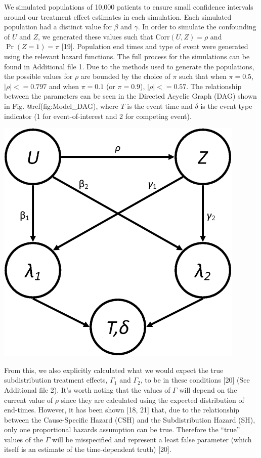 \documentclass[12pt,PhD,twoside,openright]{muthesis}
\begin{document}
We simulated populations of 10,000 patients to ensure small confidence intervals around our treatment effect estimates in each simulation. Each simulated population had a distinct value for \(\beta\) and \(\gamma\). In order to simulate the confounding of \(U\) and \(Z\), we generated these values such that \(\textrm{Corr}(U,Z) = \rho\) and \(\Pr(Z = 1) = \pi\) {[}19{]}. Population end times and type of event were generated using the relevant hazard functions. The full process for the simulations can be found in Additional file 1. Due to the methods used to generate the populations, the possible values for \(\rho\) are bounded by the choice of \(\pi\) such that when \(\pi = 0.5\), \(\left|\rho\right| <= 0.797\) and when \(\pi = 0.1\) (or \(\pi=0.9\)), \(\left|\rho\right| <= 0.57\). The relationship between the parameters can be seen in the Directed Acyclic Graph (DAG) shown in Fig. @ref(fig:Model\_DAG), where \(T\) is the event time and \(\delta\) is the event type indicator (1 for event-of-interest and 2 for competing event).
\begin{center}\includegraphics[width=450px]{figure/CR_Conf/DAG} \end{center}

From this, we also explicitly calculated what we would expect the true subdistribution treatment effects, \(\Gamma_1\) and \(\Gamma_2\), to be in these conditions {[}20{]} (See Additional file 2). It's worth noting that the values of \(\Gamma\) will depend on the current value of \(\rho\) since they are calculated using the expected distribution of end-times. However, it has been shown {[}18, 21{]} that, due to the relationship between the Cause-Specific Hazard (CSH) and the Subdistribution Hazard (SH), only one proportional hazards assumption can be true. Therefore the ``true'' values of the \(\Gamma\) will be misspecified and represent a least false parameter (which itself is an estimate of the time-dependent truth) {[}20{]}.
\end{document}
